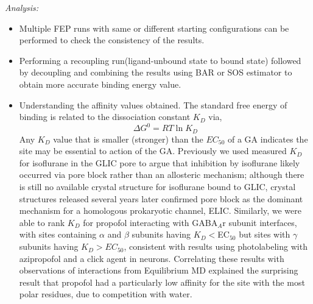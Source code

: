 \documentclass[12pt]{article}
\begin{document}
\textit{Analysis:}
	\begin{itemize}
		\item Multiple FEP runs with same or different starting configurations can be performed to check the consistency of the results.
	\item Performing a recoupling run(ligand-unbound state to bound state) followed by decoupling and combining the results using  BAR or SOS estimator to obtain more accurate binding energy value.
	\item Understanding the affinity values obtained. The standard free energy of binding is related to the dissociation constant $K_{D}$ via,
	\begin{equation}
	  \Delta G^{0}=RT  \ln K_{D}
	\end{equation}
	Any $K_{D}$ value that is smaller (stronger) than the $EC_{50}$ of a GA indicates the site may be essential to action of the GA.  %
	Previously we used measured $K_{D}$ for isoflurane in the GLIC pore to argue that inhibition by isoflurane likely occurred via pore block rather than an allosteric mechanism;\cite{LeBard2012} although there is still no available crystal structure for isoflurane bound to GLIC, crystal structures released several years later confirmed pore block as the dominant mechanism for a homologous prokaryotic channel, ELIC\cite{Chen2015}. Similarly, we were able to rank $K_{D}$ for propofol interacting with GABA$_{A}$r subunit interfaces, with sites containing $\alpha$ and $\beta$ subunits having $K_{D} <$EC$_{50}$ but sites with $\gamma$ subunits having $K_{D} >  EC_{50}$, consistent with results using photolabeling with azipropofol and a click agent in neurons. Correlating these results with observations of interactions from Equilibrium MD explained the surprising result that propofol had a particularly low affinity for the site with the most polar residues, due to competition with water.\cite{Woll2016}   %
	\end{itemize}
\end{document}
